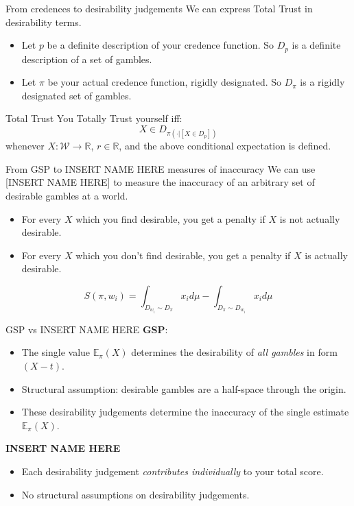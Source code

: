 \documentclass[aspectratio=169, dvipsnames]{beamer}
\newcommand{\R}{\mathbb{R}}
\newcommand{\E}{\mathbb{E}}
\newcommand{\W}{\mathcal{W}}
\begin{document}
\begin{frame}{From credences to desirability judgements}
  We can express Total Trust in desirability terms.
  \begin{itemize}
  \item Let $p$ be a definite description of your credence function. So $D_p$ is a definite description of a set of gambles.
  \item Let $\pi$ be your actual credence function, rigidly designated. So $D_{\pi}$ is a rigidly designated set of gambles.
  \end{itemize}
  \begin{block}{Total Trust}
    You Totally Trust yourself iff:
    \begin{equation}
      \label{totTrust}
      X \in D_{\pi(\cdot| [X \in D_p])}
    \end{equation}
    whenever $X: \W \to \R$, $r \in \R$, and the above conditional expectation is defined.
  \end{block}
\end{frame}

\begin{frame}{From GSP to INSERT NAME HERE measures of inaccuracy}
  We can use [INSERT NAME HERE] to measure the inaccuracy of an arbitrary set of desirable gambles at a
  world.
  \begin{itemize}
  \item For every $X$ which you find desirable, you get a penalty if $X$ is not actually desirable.
  \item For every $X$ which you don't find desirable, you get a penalty if $X$ is actually desirable.
  \end{itemize}
  \begin{equation}
      \label{KonekScoreDefAppendix}
      S(\pi, w_i) = \int_{D_{w_i} \sim D_{\pi}} x_i d\mu - \int_{D_{\pi} \sim D_{w_i}} x_i d\mu 
    \end{equation}
\end{frame}

\begin{frame}{GSP vs INSERT NAME HERE}
  \textbf{GSP}:
  \begin{itemize}
  \item The single value $\E_{\pi}(X)$ determines the desirability of \textit{all gambles} in form $(X - t)$.
  \item Structural assumption: desirable gambles are a half-space through the origin.
  \item These desirability judgements determine the inaccuracy of the single estimate $\E_{\pi}(X)$.
  \end{itemize}
  \textbf{INSERT NAME HERE}
  \begin{itemize}
  \item Each desirability judgement \textit{contributes individually} to your total score.
  \item No structural assumptions on desirability judgements.
  \end{itemize}
\end{frame}
\end{document}

